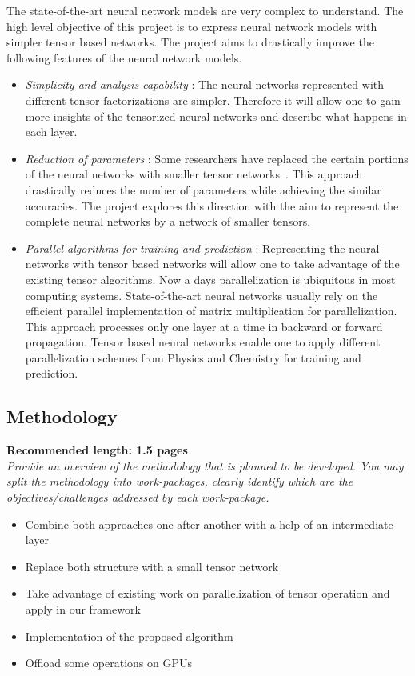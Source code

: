 The state-of-the-art neural network models are very complex to understand. The high level objective of this project is to express neural network models with simpler tensor based networks. 
The \prname project aims to drastically improve the following features of the neural network models.
\begin{itemize}
	\item \emph{Simplicity and analysis capability} : The neural networks represented with different tensor factorizations are simpler. Therefore it will allow one to gain more insights of the tensorized neural networks and describe what happens in each layer.
	\item \emph{Reduction of parameters} : Some researchers have replaced the certain portions of the neural networks with smaller tensor networks~\cite{bibid}. This approach drastically reduces the number of parameters while achieving the similar accuracies. The \prname project explores this direction with the aim to represent the complete neural networks by a network of smaller tensors. 
	\item \emph{Parallel algorithms for training and prediction} : Representing the neural networks with tensor based networks will allow one to take advantage of the existing tensor algorithms. Now a days parallelization is ubiquitous in most computing systems. State-of-the-art neural networks usually rely on the efficient parallel implementation of matrix multiplication for parallelization. This approach processes only one layer at a time in backward or forward propagation. Tensor based neural networks enable one to apply different parallelization schemes from Physics and Chemistry for training and prediction.
\end{itemize}


\subsection*{Methodology} 
\textbf{Recommended length: 1.5 pages}\\

\textit{Provide an overview of the methodology that is planned to be developed. You may split the methodology into work-packages, clearly identify which are the objectives/challenges addressed by each work-package.}

\begin{itemize}
	\item Combine both approaches one after another with a help of an intermediate layer
	\item Replace both structure with a small tensor network
	\item Take advantage of existing work on parallelization of tensor operation and apply in our framework
	\item Implementation of the proposed algorithm
	\item Offload some operations on GPUs
\end{itemize}

